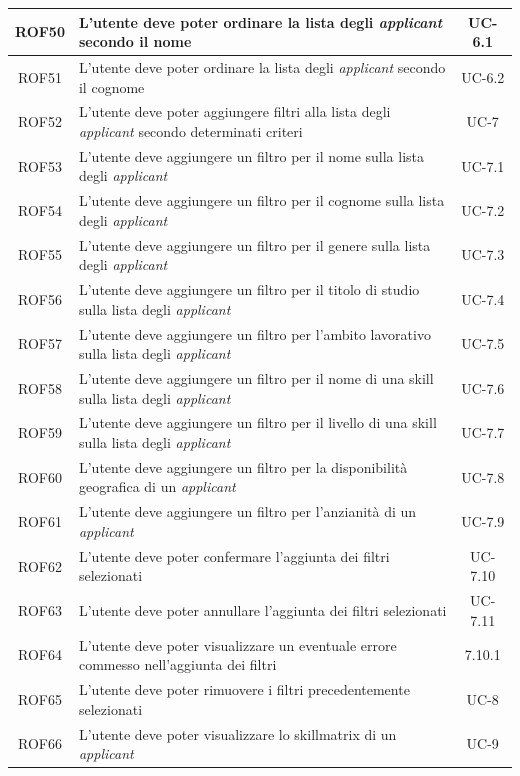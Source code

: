 \begin{center}
\begin{tabularx}{\textwidth}{|c|X|c|}
		\hline
		ROF50 & L'utente deve poter ordinare la lista degli \textit{applicant} secondo il nome & UC-6.1\\
		\hline
		ROF51 & L'utente deve poter ordinare la lista degli \textit{applicant} secondo il cognome & UC-6.2\\
		\hline
		ROF52 & L'utente deve poter aggiungere filtri alla lista degli \textit{applicant} secondo determinati criteri &  UC-7\\
		\hline
		ROF53 & L'utente deve aggiungere un filtro per il nome sulla lista degli \textit{applicant} & UC-7.1 \\
		\hline
		ROF54 & L'utente deve aggiungere un filtro per il cognome sulla lista degli \textit{applicant} & UC-7.2\\
		\hline
		ROF55 & L'utente deve aggiungere un filtro per il genere sulla lista degli \textit{applicant} & UC-7.3\\
		\hline
		ROF56 & L'utente deve aggiungere un filtro per il titolo di studio sulla lista degli \textit{applicant} & UC-7.4 \\
		\hline
		ROF57 & L'utente deve aggiungere un filtro per l'ambito lavorativo sulla lista degli \textit{applicant} & UC-7.5\\
		\hline
		ROF58 & L'utente deve aggiungere un filtro per il nome di una skill sulla lista degli \textit{applicant} &  UC-7.6 \\
		\hline
		ROF59 & L'utente deve aggiungere un filtro per il livello di una skill sulla lista degli \textit{applicant} & UC-7.7 \\
		\hline
		ROF60 & L'utente deve aggiungere un filtro per la disponibilità geografica di un \textit{applicant}& UC-7.8\\
		\hline
		ROF61 & L'utente deve aggiungere un filtro per l'anzianità di un \textit{applicant}& UC-7.9\\
		\hline
		ROF62 & L'utente deve poter confermare l'aggiunta dei filtri selezionati& UC-7.10\\
		\hline
		ROF63 & L'utente deve poter annullare l'aggiunta dei filtri selezionati& UC-7.11\\
		\hline
		ROF64 & L'utente deve poter visualizzare un eventuale errore commesso nell'aggiunta dei filtri & 7.10.1 \\
		\hline
		ROF65 & L'utente deve poter rimuovere i filtri precedentemente selezionati & UC-8\\
		\hline
		ROF66 & L'utente deve poter visualizzare lo skillmatrix di un \textit{applicant} & UC-9\\

\end{tabularx}
\end{center}
